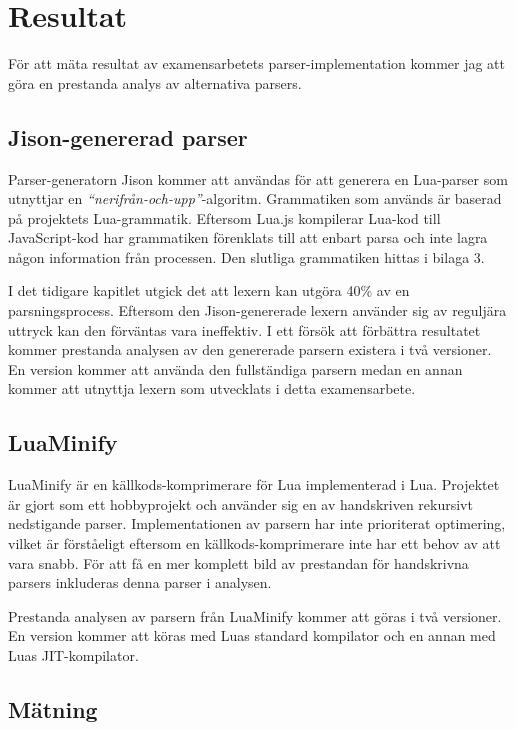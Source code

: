 \section{Resultat}

För att mäta resultat av examensarbetets parser-implementation kommer jag att
göra en prestanda analys av alternativa parsers.

\subsection{Jison-genererad parser}

Parser-generatorn Jison kommer att användas för att generera en Lua-parser som
utnyttjar en \textit{``nerifrån-och-upp''}-algoritm. Grammatiken som används
är baserad på \cite{lua.js} projektets Lua-grammatik. Eftersom Lua.js
kompilerar Lua-kod till JavaScript-kod har grammatiken förenklats till att
enbart parsa och inte lagra någon information från processen. Den slutliga
grammatiken hittas i bilaga 3.

I det tidigare kapitlet utgick det att lexern kan utgöra 40\% av en
parsningsprocess. Eftersom den Jison-genererade lexern använder sig av
reguljära uttryck kan den förväntas vara ineffektiv. I ett försök att
förbättra resultatet kommer prestanda analysen av den genererade parsern
existera i två versioner. En version kommer att använda den fullständiga
parsern medan en annan kommer att utnyttja lexern som utvecklats i detta
examensarbete.

\subsection{LuaMinify}

LuaMinify är en källkods-komprimerare för Lua implementerad i Lua. Projektet
är gjort som ett hobbyprojekt och använder sig en av handskriven rekursivt
nedstigande parser. Implementationen av parsern har inte prioriterat
optimering, vilket är förståeligt eftersom en källkods-komprimerare inte har
ett behov av att vara snabb. För att få en mer komplett bild av prestandan för
handskrivna parsers inkluderas denna parser i analysen.

Prestanda analysen av parsern från LuaMinify kommer att göras i två versioner.
En version kommer att köras med Luas standard kompilator och en annan med Luas
JIT-kompilator.

\subsection{Mätning}

